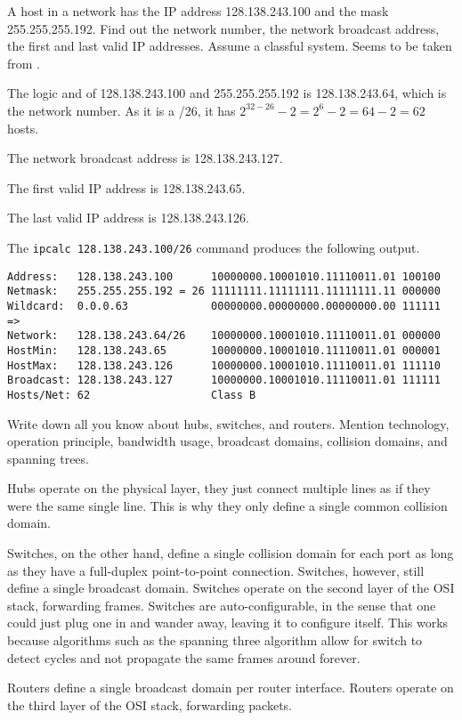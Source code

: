 \begin{Exercise}
A host in a network has the IP address 128.138.243.100 and the mask 255.255.255.192.
Find out the network number, the network broadcast address, the first and last valid IP addresses.
Assume a classful system. Seems to be taken from \cite{unix-system-administration-handbook-nemeth-2000}.
\end{Exercise}
\begin{Answer}
The logic and of 128.138.243.100 and 255.255.255.192 is 128.138.243.64, which is the network number.
As it is a /26, it has \(2^{32-26} - 2 = 2^{6} - 2 = 64 - 2 = 62\) hosts.

The network broadcast address is 128.138.243.127.

The first valid IP address is 128.138.243.65.

The last valid IP address is 128.138.243.126.

The \texttt{ipcalc 128.138.243.100/26} command produces the following output.

\small\begin{verbatim}
Address:   128.138.243.100      10000000.10001010.11110011.01 100100
Netmask:   255.255.255.192 = 26 11111111.11111111.11111111.11 000000
Wildcard:  0.0.0.63             00000000.00000000.00000000.00 111111
=>
Network:   128.138.243.64/26    10000000.10001010.11110011.01 000000
HostMin:   128.138.243.65       10000000.10001010.11110011.01 000001
HostMax:   128.138.243.126      10000000.10001010.11110011.01 111110
Broadcast: 128.138.243.127      10000000.10001010.11110011.01 111111
Hosts/Net: 62                   Class B
\end{verbatim}
\end{Answer}

\begin{Exercise}
Write down all you know about hubs, switches, and routers.
Mention technology, operation principle, bandwidth usage, broadcast domains, collision domains, and spanning trees.
\end{Exercise}
\begin{Answer}
Hubs operate on the physical layer, they just connect multiple lines as if they were the same single line. This is why they only define a single common collision domain.

Switches, on the other hand, define a single collision domain for each port as long as they have a full-duplex point-to-point connection. Switches, however, still define a single broadcast domain.
Switches operate on the second layer of the OSI stack, forwarding frames.
Switches are auto-configurable, in the sense that one could just plug one in and wander away, leaving it to configure itself. This works because algorithms such as the spanning three algorithm allow for switch to detect cycles and not propagate the same frames around forever.

Routers define a single broadcast domain per router interface. Routers operate on the third layer of the OSI stack, forwarding packets.
\end{Answer}

